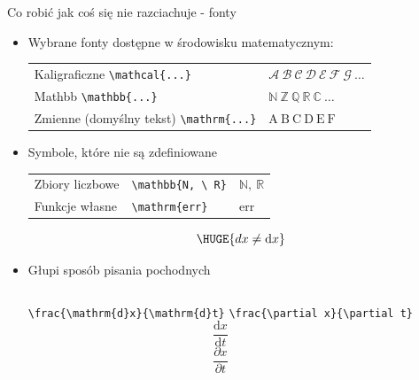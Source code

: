 \documentclass{beamer}
\theoremstyle{newblock}
\begin{document}
\begin{frame}[fragile]{Co robić jak coś się nie razciachuje - fonty}

    \begin{itemize}
        \item Wybrane fonty dostępne w środowisku matematycznym:
        
        \begin{tabular}{l l}
            
        Kaligraficzne \verb|\mathcal{...}| & $\mathcal{A \ B \ C \ D \ E \ F \ G \ \ldots}$\\
    
        Mathbb \verb|\mathbb{...}| & $\mathbb{N \ Z \ Q \ R \ C \  \ldots }$\\
    
        Zmienne (domyślny tekst) \verb|\mathrm{...}| & $\mathrm{A \ B \ C \ D \ E \ F}$

        \end{tabular}

        \item Symbole, które nie są zdefiniowane

        \begin{tabular}{l l l }
             Zbiory liczbowe & \verb|\mathbb{N, \ R}| & $\mathbb{N, \ R}$\\
             Funkcje własne  &  \verb|\mathrm{err}|  & $\mathrm{err}$\\
        \end{tabular}
        
        \begin{equation*}
            \HUGE{dx \neq \mathrm{d}x}
        \end{equation*}
        
        \item Głupi sposób pisania pochodnych
        \begin{columns}
            \centering
            \verb|\frac{\mathrm{d}x}{\mathrm{d}t}|
            \verb|\frac{\partial x}{\partial t}|
                \begin{equation*}
                    \frac{\mathrm{d}x}{\mathrm{d}t}
                \end{equation*}
                \begin{equation*}
                    \frac{\partial x}{\partial t}
                \end{equation*}
        \end{columns}
    \end{itemize}
   
\end{frame}
\end{document}
